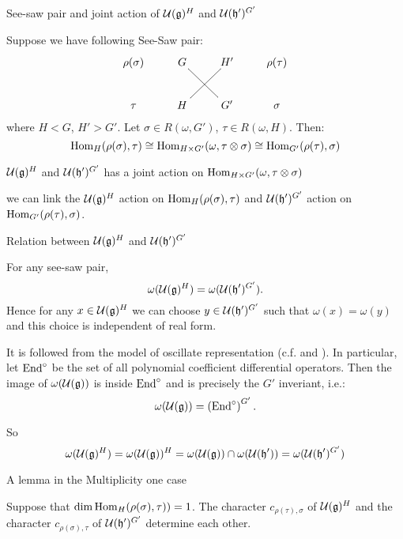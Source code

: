 \documentclass{beamer}
\begin{document}
\begin{frame}{See-saw pair and  joint action of $\mathcal{U}(\mathfrak{g})^H$ 
and $\mathcal{U}(\mathfrak{h}')^{G'}$}


Suppose we have following See-Saw pair:
\[
\xymatrix{
\rho(\sigma)& G \ar@{-}[dr] & H'& \rho(\tau)\\
\tau &H\ar@{-}[ur] & G' & \sigma
}
\]
where $H < G$, $H'> G'$. Let $\sigma\in R(\omega, G')$, $\tau\in R(\omega,H)$.
Then:
\[
{\rm Hom}_{H}(\rho(\sigma), \tau) 
\cong  {\rm Hom}_{H\times G'}(\omega, \tau\otimes \sigma)
\cong  {\rm Hom}_{G'}(\rho(\tau), \sigma)
\]

{\color{blue}
 $\mathcal{U}(\mathfrak{g})^H$ and $\mathcal{U}(\mathfrak{h}')^{G'}$ 
has a joint action on ${\rm Hom}_{H\times G'}(\omega,\tau\otimes\sigma)$

we can link the $\mathcal{U}(\mathfrak{g})^H$ action on ${\rm Hom}_H(\rho(\sigma),\tau)$ and $\mathcal{U}(\mathfrak{h}')^{G'}$  action on ${\rm Hom}_{G'}(\rho(\tau),\sigma)$.
}
\end{frame}

\begin{frame}{Relation between $\mathcal{U}(\mathfrak{g})^H$ and $\mathcal{U}(\mathfrak{h}')^{G'}$}
\begin{lemma}\label{lemma:ugkcorr}
For any see-saw pair, 
\[
\omega(\mathcal{U}(\mathfrak{g})^H) = \omega(\mathcal{U}(\mathfrak{h}')^{G'}).
\]
Hence for any $x\in \mathcal{U}(\mathfrak{g})^H$ we can choose $y\in \mathcal{U}(\mathfrak{h}')^{G'}$ 
such that $\omega(x) = \omega(y)$ and this choice is independent of real form.
\end{lemma}

It is followed from the model of oscillate representation (c.f. \cite{Adams2007} 
and \cite{Howe1989Rem}).
In particular, let ${\rm End}^\circ$ be the set of all polynomial coefficient differential operators.
Then the image of $\omega(\mathcal{U}(\mathfrak{g}))$ is inside ${\rm End}^\circ$ and is precisely the $G'$ inveriant, i.e.:
\[
\omega(\mathcal{U}(\mathfrak{g})) = \left({\rm End}^\circ\right)^{G'}.
\]

So 
\[
\omega(\mathcal{U}(\mathfrak{g})^H) = \omega(\mathcal{U}(\mathfrak{g}))^H = \omega(\mathcal{U}(\mathfrak{g}))\cap \omega(\mathcal{U}(\mathfrak{h}')) = \omega(\mathcal{U}(\mathfrak{h}')^{G'})
\]
\end{frame}

\begin{frame}{A lemma in the Multiplicity one case}
\begin{lemma}
Suppose that $\dim {\rm Hom}_H(\rho(\sigma),\tau)) =1$.
The character $c_{\rho(\tau),\sigma}$ of $\mathcal{U}(\mathfrak{g})^H$ and
 the character $c_{\rho(\sigma),\tau}$ of $\mathcal{U}(\mathfrak{h}')^{G'}$ determine each other.
\end{lemma}

\end{frame}
\end{document}
